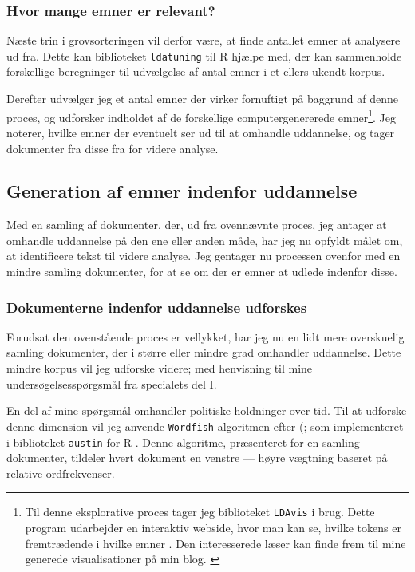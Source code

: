 \subsubsection{Hvor mange emner er relevant?}
Næste trin i grovsorteringen vil derfor være, at finde antallet emner at analysere ud fra. 
Dette kan biblioteket \texttt{ldatuning} til R hjælpe med, der kan sammenholde forskellige beregninger til udvælgelse af antal emner i et ellers ukendt korpus\autocite{nikitaSelectNumberTopics2016}.

Derefter udvælger jeg et antal emner der virker fornuftigt på baggrund af denne proces,
og udforsker indholdet af de forskellige computergenererede emner\footnote{
Til denne eksplorative proces tager jeg biblioteket \texttt{LDAvis} i brug.
Dette program udarbejder en interaktiv webside, hvor man kan se,
hvilke tokens er fremtrædende i hvilke emner \autocite{sievertCpsievertLDAvis2020}.
Den interesserede læser kan finde frem til mine generede visualisationer på min blog. \autocite{andersenSelectedAssignmentsAarhus}}.
Jeg noterer, hvilke emner der eventuelt ser ud til at omhandle uddannelse, og tager dokumenter fra disse fra for videre analyse.

\subsection{Generation af emner indenfor uddannelse}
Med en samling af dokumenter, der, ud fra ovennævnte proces, jeg antager at omhandle uddannelse på den ene eller anden måde, har jeg nu opfyldt målet om, at identificere tekst til videre analyse.
Jeg gentager nu processen ovenfor med en mindre samling dokumenter, for at se om der er emner at udlede indenfor disse.

\subsubsection{Dokumenterne indenfor uddannelse udforskes}
Forudsat den ovenstående proces er vellykket, har jeg nu en lidt mere overskuelig samling dokumenter, der i større eller mindre grad omhandler uddannelse.
Dette mindre korpus vil jeg udforske videre; med henvisning til mine undersøgelsesspørgsmål fra specialets del I.

En del af mine spørgsmål omhandler politiske holdninger over tid. Til at udforske denne dimension vil jeg anvende \texttt{Wordfish}-algoritmen efter \citeauthor{slapinScalingModelEstimating2008} (\citeyear{slapinScalingModelEstimating2008}; som implementeret i biblioteket \texttt{austin} for R \autocite{loweAustinPackageDoing2019}.
Denne algoritme, præsenteret for en samling dokumenter, tildeler hvert dokument en venstre — høyre vægtning baseret på relative ordfrekvenser.

